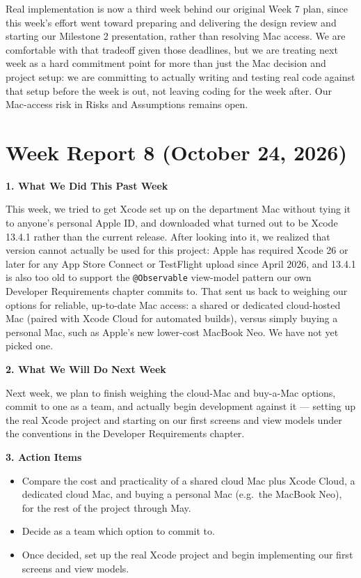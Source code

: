 Real implementation is now a third week behind our original Week 7 plan, since this week's effort went toward preparing and delivering the design review and starting our Milestone 2 presentation, rather than resolving Mac access. We are comfortable with that tradeoff given those deadlines, but we are treating next week as a hard commitment point for more than just the Mac decision and project setup: we are committing to actually writing and testing real code against that setup before the week is out, not leaving coding for the week after. Our Mac-access risk in Risks and Assumptions remains open.

\section{Week Report 8 (October 24, 2026)}

\noindent\textbf{1. What We Did This Past Week}

This week, we tried to get Xcode set up on the department Mac without tying it to anyone's personal Apple ID, and downloaded what turned out to be Xcode 13.4.1 rather than the current release. After looking into it, we realized that version cannot actually be used for this project: Apple has required Xcode 26 or later for any App Store Connect or TestFlight upload since April 2026, and 13.4.1 is also too old to support the \texttt{@Observable} view-model pattern our own Developer Requirements chapter commits to. That sent us back to weighing our options for reliable, up-to-date Mac access: a shared or dedicated cloud-hosted Mac (paired with Xcode Cloud for automated builds), versus simply buying a personal Mac, such as Apple's new lower-cost MacBook Neo. We have not yet picked one.

\noindent\textbf{2. What We Will Do Next Week}

Next week, we plan to finish weighing the cloud-Mac and buy-a-Mac options, commit to one as a team, and actually begin development against it --- setting up the real Xcode project and starting on our first screens and view models under the conventions in the Developer Requirements chapter.

\noindent\textbf{3. Action Items}
\begin{itemize}
\item Compare the cost and practicality of a shared cloud Mac plus Xcode Cloud, a dedicated cloud Mac, and buying a personal Mac (e.g.\ the MacBook Neo), for the rest of the project through May.
\item Decide as a team which option to commit to.
\item Once decided, set up the real Xcode project and begin implementing our first screens and view models.
\end{itemize}

